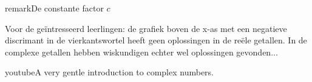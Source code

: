 \documentclass{ximera}
\begin{document}
\begin{expandable}{remark}{De constante factor \(c\)}
\begin{remark}
\begin{image}
\begin{scope}[xshift=3cm]
\begin{tikzpicture}[scale=1]
        \end{tikzpicture}
        \end{scope}


        \begin{scope}[xshift=6cm]    
        \end{scope}
        
    \end{image}
    
    
    Voor de geïntresseerd leerlingen: de grafiek boven de x-as met een negatieve discrimant in de vierkantswortel heeft geen oplossingen in de reële getallen. 
    In de complexe getallen hebben wiskundigen echter wel oplossingen gevonden...

    \begin{expandable}{youtube}{A very gentle introduction to complex numbers.}
    \end{expandable}   

    
\end{remark}
\end{expandable}
\end{document}
